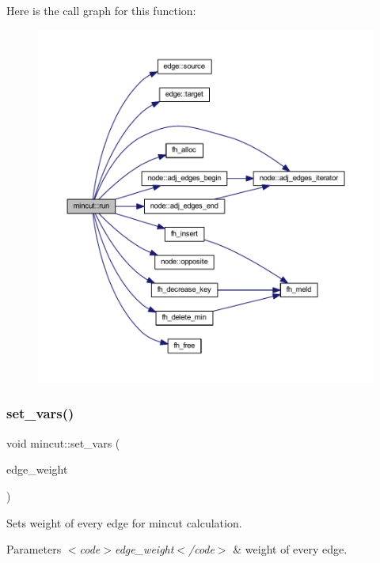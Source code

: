 Here is the call graph for this function\+:\nopagebreak
\begin{figure}[H]
\begin{center}
\leavevmode
\includegraphics[width=350pt]{classmincut_ab7e374a3f73387aa61587643a5f44e43_cgraph}
\end{center}
\end{figure}
\mbox{\label{classmincut_a74f3619c8fcda145e7ec1f87d5dd5c66}} 
\subsubsection{\texorpdfstring{set\+\_\+vars()}{set\_vars()}}
{\footnotesize\ttfamily void mincut\+::set\+\_\+vars (\begin{DoxyParamCaption}\item[{const \mbox{\hyperlink{classedge__map}{edge\+\_\+map}}$<$ int $>$ \&}]{edge\+\_\+weight }\end{DoxyParamCaption})}

Sets weight of every edge for mincut calculation.


\begin{DoxyParams}{Parameters}
{\em $<$code$>$edge\+\_\+weight$<$/code$>$} & weight of every edge. \\
\hline
\end{DoxyParams}


